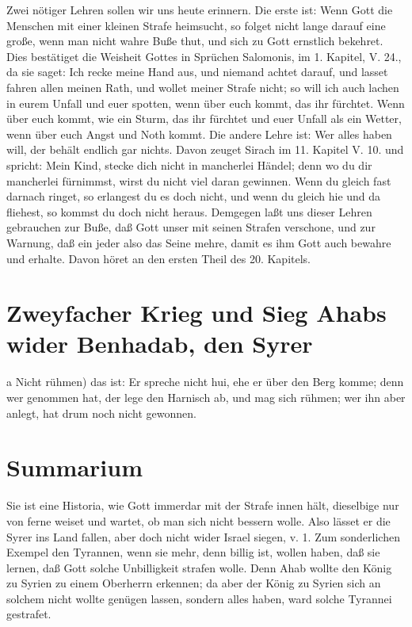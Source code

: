 Zwei nötiger Lehren sollen wir uns heute erinnern. Die erste ist: Wenn Gott die Menschen mit einer kleinen Strafe heimsucht, so folget nicht lange darauf eine große, wenn man nicht wahre Buße thut, und sich zu Gott ernstlich bekehret. Dies bestätiget die Weisheit Gottes in Sprüchen Salomonis, im 1. Kapitel, V. 24., da sie saget: Ich recke meine Hand aus, und niemand achtet darauf, und lasset fahren allen meinen Rath, und wollet meiner Strafe nicht; so will ich auch lachen in eurem Unfall und euer spotten, wenn über euch kommt, das ihr fürchtet. Wenn über euch kommt, wie ein Sturm, das ihr fürchtet und euer Unfall als ein Wetter, wenn über euch Angst und Noth kommt. Die andere Lehre ist: Wer alles haben will, der behält endlich gar nichts. Davon zeuget Sirach im 11. Kapitel V. 10. und spricht: Mein Kind, stecke dich nicht in mancherlei Händel; denn wo du dir mancherlei fürnimmst, wirst du nicht viel daran gewinnen. Wenn du gleich fast darnach
ringet, so erlangest du es doch nicht, und wenn du gleich hie und da fliehest, so kommst du doch nicht heraus. Demgegen laßt uns dieser Lehren gebrauchen zur Buße, daß Gott unser mit seinen Strafen verschone, und zur Warnung, daß ein jeder also das Seine mehre, damit es ihm Gott auch bewahre und erhalte. Davon höret an den ersten Theil des 20. Kapitels.

\section[Zweyfacher Krieg und Sieg Ahabs wider Benhadab, den]{Zweyfacher Krieg und Sieg Ahabs wider Benhadab, den Syrer}

a Nicht rühmen) das ist: Er spreche nicht hui, ehe er über den Berg komme; denn wer genommen hat, der lege den Harnisch ab, und mag sich rühmen; wer ihn aber anlegt, hat drum noch nicht gewonnen.

\section{Summarium}

Sie ist eine Historia, wie Gott immerdar mit der Strafe innen hält, dieselbige nur von ferne weiset und wartet, ob man sich nicht bessern wolle. Also lässet er die Syrer ins Land fallen, aber doch nicht wider Israel siegen, v. 1. Zum sonderlichen Exempel den Tyrannen, wenn sie mehr, denn billig ist, wollen haben, daß sie lernen, daß Gott solche Unbilligkeit strafen wolle. Denn
Ahab wollte den König zu Syrien zu einem Oberherrn erkennen; da aber der König zu Syrien sich an solchem nicht wollte genügen lassen, sondern alles haben, ward solche Tyrannei gestrafet.


